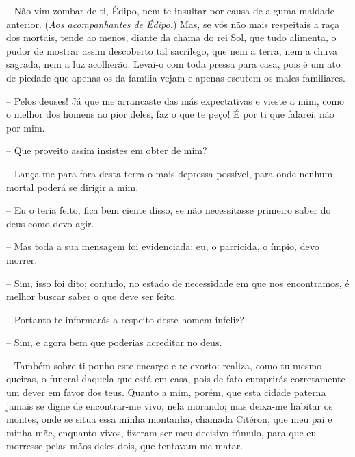  --   Não vim zombar de ti, Édipo, nem te insultar por causa de alguma maldade
anterior. (\emph{Aos acompanhantes de Édipo.}) Mas, se vós não mais
respeitais a raça dos mortais, tende ao menos, diante da chama do rei
Sol, que tudo alimenta, o pudor de mostrar assim descoberto tal
sacrílego, que nem a terra, nem a chuva sagrada, nem a luz acolherão.
Levai-o com toda pressa  para casa, pois é um ato de piedade que
apenas os da família vejam e apenas escutem os males familiares.

 --   Pelos deuses! Já que me arrancaste das más expectativas e vieste a mim,
como o melhor dos homens ao pior deles, faz o que te peço! É por ti que
falarei, não por mim.

 --   Que proveito assim insistes em obter de mim?

 --   Lança-me para fora desta terra o mais depressa possível, para onde
nenhum mortal poderá se dirigir a mim.

 --   Eu o teria feito, fica bem ciente disso, se não necessitasse primeiro
saber do deus como devo agir.

 --    Mas toda a sua mensagem foi evidenciada: eu, o parricida, o
ímpio, devo morrer.

 --   Sim, isso foi dito; contudo, no estado de necessidade em que nos
encontramos, é melhor buscar saber o que deve ser feito.

 --   Portanto te informarás a respeito deste homem infeliz?

 --   Sim, e agora bem que poderias acreditar no deus.

 --   Também sobre ti ponho este encargo e te exorto: realiza, como tu mesmo
queiras, o funeral daquela que está em casa, pois de fato cumprirás
corretamente um dever em favor dos teus. Quanto a mim, porém, que esta
cidade paterna jamais se digne  de encontrar-me vivo, nela
morando; mas deixa-me habitar os montes, onde se situa essa minha
montanha, chamada Citéron, que meu pai e minha mãe, enquanto vivos,
fizeram ser meu decisivo túmulo, para que eu morresse pelas mãos deles
dois, que tentavam me matar.

